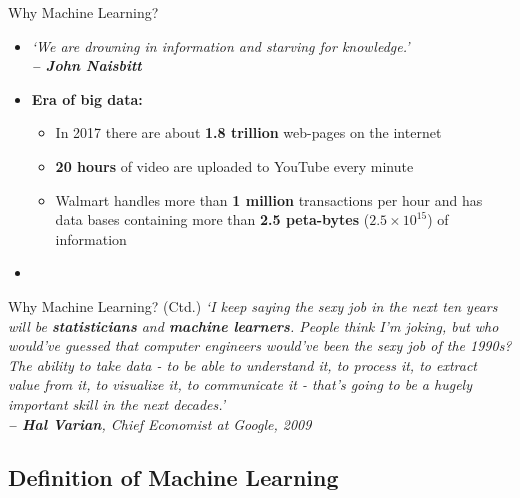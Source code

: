 \begin{frame}{Why Machine Learning?}{}
	\begin{itemize}
		\item \textit{`We are drowning in information and starving for knowledge.' \\
			\hfill\textbf{-- John Naisbitt}}
		\item \textbf{Era of big data:}
		\begin{itemize}
			\item In 2017 there are about \textbf{1.8 trillion} web-pages on the internet
			\item \textbf{20 hours} of video are uploaded to YouTube every minute
			\item Walmart handles more than \textbf{1 million} transactions per hour and has data bases containing more 
				than \textbf{2.5 peta-bytes} ($2.5 \times 10^{15}$) of information
		\end{itemize}
		\item {}
	\end{itemize}
\end{frame}


\begin{frame}{Why Machine Learning? (Ctd.)}{}
	\textit{`I keep saying the sexy job in the next ten years will be \textbf{statisticians} and \textbf{machine learners}.
		People think I’m joking, but who would’ve guessed that computer engineers would’ve been the sexy job of the
		1990s? The ability to take data - to be able to understand it, to process it, to extract value from it, to visualize it,
		to communicate it - that’s going to be a hugely important skill in the next decades.' \\
		\hfill\textbf{-- Hal Varian}, Chief Economist at Google, 2009}
\end{frame}


\subsection{Definition of Machine Learning}

